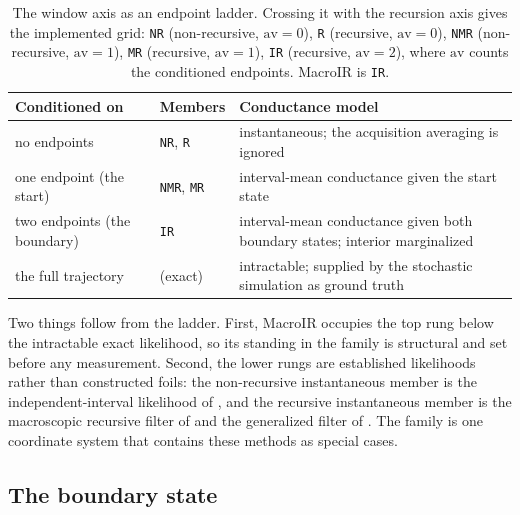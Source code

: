 \begin{table}[htbp]
\centering
\begin{tabular}{@{}lll@{}}
\toprule
Conditioned on & Members & Conductance model \\
\midrule
no endpoints & \texttt{NR}, \texttt{R} & instantaneous; the acquisition averaging is ignored \\
one endpoint (the start) & \texttt{NMR}, \texttt{MR} & interval-mean conductance given the start state \\
two endpoints (the boundary) & \texttt{IR} & interval-mean conductance given both boundary states; interior marginalized \\
the full trajectory & (exact) & intractable; supplied by the stochastic simulation as ground truth \\
\bottomrule
\end{tabular}
\caption{The window axis as an endpoint ladder. Crossing it with the recursion axis gives
the implemented grid: \texttt{NR} (non-recursive, $\mathrm{av}=0$), \texttt{R} (recursive,
$\mathrm{av}=0$), \texttt{NMR} (non-recursive, $\mathrm{av}=1$), \texttt{MR} (recursive,
$\mathrm{av}=1$), \texttt{IR} (recursive, $\mathrm{av}=2$), where $\mathrm{av}$ counts the
conditioned endpoints. MacroIR is \texttt{IR}.} %
\label{tab:ladder}
\end{table}

Two things follow from the ladder. First, MacroIR occupies the top rung below the
intractable exact likelihood, so its standing in the family is structural and set before
any measurement. Second, the lower rungs are established likelihoods rather than
constructed foils: the non-recursive instantaneous member is the independent-interval
likelihood of \citet{milescu2005maximum}, and the recursive instantaneous member is the
macroscopic recursive filter of \citet{moffatt2007estimation} and the generalized filter
of \citet{munch2022bayesian}. The family is one coordinate system that contains these
methods as special cases.

\subsection*{The boundary state}

